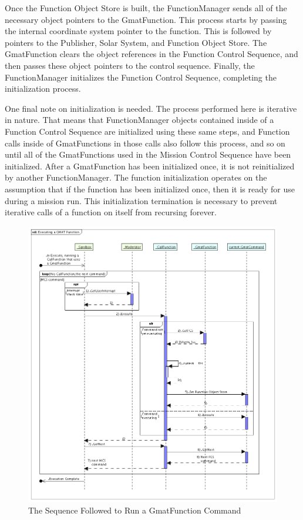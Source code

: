 Once the Function Object Store is built, the FunctionManager sends all of the necessary object
pointers to the GmatFunction.  This process starts by passing the internal coordinate system pointer
to the function.  This is followed by pointers to the Publisher, Solar System, and Function Object
Store.  The GmatFunction clears the object references in the Function Control Sequence, and then
passes these object pointers to the control sequence.  Finally, the FunctionManager initializes the
Function Control Sequence, completing the initialization process.

One final note on initialization is needed.  The process performed here is iterative in nature. 
That means that FunctionManager objects contained inside of a Function Control Sequence are
initialized using these same steps, and Function calls inside of GmatFunctions in those calls also
follow this process, and so on until all of the GmatFunctions used in the Mission Control Sequence
have been initialized.  After a GmatFunction has been initialized once, it is not reinitialized by
another FunctionManager.  The function initialization operates on the assumption that if the
function has been initialized once, then it is ready for use during a mission run.  This
initialization termination is necessary to prevent iterative calls of a function on itself from
recursing forever.

\begin{figure}[H]
\begin{center}
\includegraphics[444,491]{Images/ExecutingaGMATFunction.png}
\caption{\label{figure:GmatFunctionExecution}The Sequence Followed to Run a GmatFunction
Command}
\end{center}
\end{figure}


